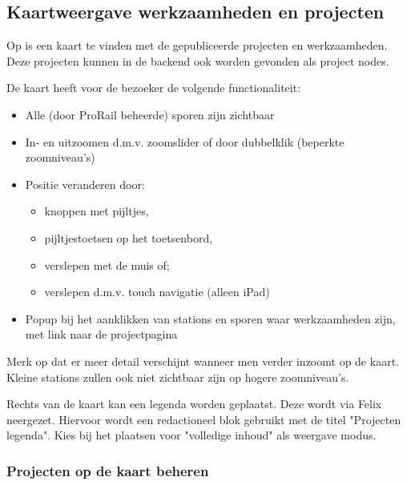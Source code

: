 \subsection{Kaartweergave werkzaamheden en projecten}\label{kaart}
Op  is een kaart te vinden met de gepubliceerde projecten en werkzaamheden. Deze projecten kunnen in de backend ook worden gevonden als project nodes.

De kaart heeft voor de bezoeker de volgende functionaliteit:
\begin{itemize}
\item Alle (door ProRail beheerde) sporen zijn zichtbaar
\item In- en uitzoomen d.m.v. zoomslider of door dubbelklik (beperkte zoomniveau's)
\item Positie veranderen door:
\begin{itemize}
\item knoppen met pijltjes,
\item pijltjestoetsen op het toetsenbord,
\item verslepen met de muis of;
\item verslepen d.m.v. touch navigatie (alleen iPad)
\end{itemize}
\item Popup bij het aanklikken van stations en sporen waar werkzaamheden zijn, met link naar de projectpagina
\end{itemize}
Merk op dat er meer detail verschijnt wanneer men verder inzoomt op de kaart. Kleine stations zullen ook niet zichtbaar zijn op hogere zoomniveau's.

Rechts van de kaart kan een legenda worden geplaatst. Deze wordt via Felix neergezet. Hiervoor wordt een redactioneel blok gebruikt met de titel "Projecten legenda". Kies bij het plaatsen voor "volledige inhoud" als weergave modus.

\subsubsection{Projecten op de kaart beheren}

